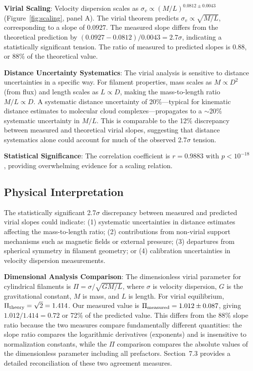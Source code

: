 \documentclass[usenatbib]{rasti}
\begin{document}
\textbf{Virial Scaling}: Velocity dispersion scales as $\sigma_v \propto (M/L)^{0.0812 \pm 0.0043}$ (Figure~\ref{fig:scaling}, panel A). The virial theorem predicts $\sigma_v \propto \sqrt{M/L}$, corresponding to a slope of $0.0927$. The measured slope differs from the theoretical prediction by $(0.0927 - 0.0812)/0.0043 = 2.7\sigma$, indicating a statistically significant tension. The ratio of measured to predicted slopes is $0.88$, or 88\% of the theoretical value.

\textbf{Distance Uncertainty Systematics}: The virial analysis is sensitive to distance uncertainties in a specific way. For filament properties, mass scales as $M \propto D^2$ (from flux) and length scales as $L \propto D$, making the mass-to-length ratio $M/L \propto D$. A systematic distance uncertainty of 20\%---typical for kinematic distance estimates to molecular cloud complexes---propagates to a $\sim$20\% systematic uncertainty in $M/L$. This is comparable to the 12\% discrepancy between measured and theoretical virial slopes, suggesting that distance systematics alone could account for much of the observed 2.7$\sigma$ tension.

\textbf{Statistical Significance}: The correlation coefficient is $r = 0.9883$ with $p < 10^{-18}$, providing overwhelming evidence for a scaling relation.

\subsection{Physical Interpretation}

The statistically significant 2.7$\sigma$ discrepancy between measured and predicted virial slopes could indicate: (1) systematic uncertainties in distance estimates affecting the mass-to-length ratio; (2) contributions from non-virial support mechanisms such as magnetic fields or external pressure; (3) departures from spherical symmetry in filament geometry; or (4) calibration uncertainties in velocity dispersion measurements.

\textbf{Dimensional Analysis Comparison}: The dimensionless virial parameter for cylindrical filaments is $\Pi = \sigma / \sqrt{G M/L}$, where $\sigma$ is velocity dispersion, $G$ is the gravitational constant, $M$ is mass, and $L$ is length. For virial equilibrium, $\Pi_{\rm theory} = \sqrt{2} = 1.414$. Our measured value is $\Pi_{\rm measured} = 1.012 \pm 0.087$, giving $1.012/1.414 = 0.72$ or 72\% of the predicted value. This differs from the 88\% slope ratio because the two measures compare fundamentally different quantities: the slope ratio compares the logarithmic derivatives (exponents) and is insensitive to normalization constants, while the $\Pi$ comparison compares the absolute values of the dimensionless parameter including all prefactors. Section~7.3 provides a detailed reconciliation of these two agreement measures.
\end{document}
